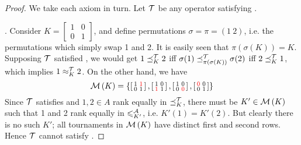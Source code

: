 \begin{proof}

    We take each axiom in turn. Let $\mathcal{T}$ be any operator satisfying
    \chainmin{}.

    \anon{}. Consider $K = \left[\begin{smallmatrix} 1&0\\0&1
    \end{smallmatrix}\right]$, and define permutations $\sigma = \pi = (1\ 2)$,
    i.e. the permutations which simply swap 1 and 2. It is easily seen that
    $\pi(\sigma(K)) = K$. Supposing $\mathcal{T}$ satisfied \anon{}, we would
    get $1 \preceq_K^{\mathcal{T}} 2$ iff $\sigma(1) \preceq_{\pi(\sigma(K))}^{\mathcal{T}} \sigma(2)$
    iff $2 \preceq_K^{\mathcal{T}} 1$, which implies $1 \approx_K^{\mathcal{T}} 2$.
    On the other hand, we have
    \[
        \operatorname{\mathcal{M}}\left({K}\right) = \left\{
           \left[\begin{smallmatrix}
               1 & \color{red}{1} \\
               0 & 1
           \end{smallmatrix}\right],
           \left[\begin{smallmatrix}
               1 & 0 \\
               \color{red}{1} & 1
           \end{smallmatrix}\right],
           \left[\begin{smallmatrix}
               1 & 0 \\
               0 & \color{red}{0}
           \end{smallmatrix}\right],
           \left[\begin{smallmatrix}
               \color{red}{0} & 0 \\
               0 & 1
           \end{smallmatrix}\right]
        \right\}
    \]
    Since $\mathcal{T}$ satisfies \chainmin{} and $1, 2 \in A$ rank equally
    in ${\preceq_K^{\mathcal{T}}}$, there must be $K' \in \operatorname{\mathcal{M}}\left({K}\right)$ such that 1 and 2 rank
    equally in ${\leqslant^{\mathcal{A}}_{K'}}$, i.e. $K'(1) = K'(2)$. But clearly there is no
    such $K'$; all tournaments in $\operatorname{\mathcal{M}}\left({K}\right)$ have distinct first and second
    rows. Hence $\mathcal{T}$ cannot satisfy \anon{}.


\end{proof}
